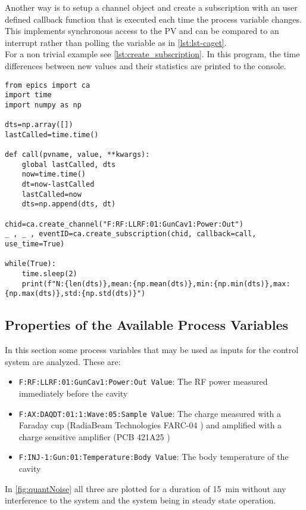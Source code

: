 Another way is to setup a channel object and create a subscription with an user defined callback function that is executed each time the process variable changes. This implements synchronous access to the PV and can be compared to an interrupt rather than polling the variable as in \autoref{lst:lst-caget}.\\
For a non trivial example see \autoref{lst:create_subscription}. In this program, the time differences between new values and their statistics are printed to the console.

\begin{lstlisting}[style=python,caption = Using a user defined callback function to access an EPICS process value, label = lst:create_subscription]
from epics import ca
import time
import numpy as np

dts=np.array([])
lastCalled=time.time()

def call(pvname, value, **kwargs):
	global lastCalled, dts
	now=time.time()
	dt=now-lastCalled
	lastCalled=now
	dts=np.append(dts, dt)

chid=ca.create_channel("F:RF:LLRF:01:GunCav1:Power:Out")
_ , _ , eventID=ca.create_subscription(chid, callback=call, use_time=True)

while(True):
	time.sleep(2)
	print(f"N:{len(dts)},mean:{np.mean(dts)},min:{np.min(dts)},max:{np.max(dts)},std:{np.std(dts)}")
\end{lstlisting}




\subsection{Properties of the Available Process Variables}
In this section some process variables that may be used as inputs for the control system are analyzed. These are:
\begin{itemize}
\item \texttt{F:RF:LLRF:01:GunCav1:Power:Out Value}: The RF power measured immediately before the cavity
\item \texttt{F:AX:DAQDT:01:1:Wave:05:Sample Value}: The charge measured with a Faraday cup (RadiaBeam Technologies FARC-04 \cite{radiabeamFaradayCups}) and amplified with a charge sensitive amplifier (PCB 421A25 \cite{pcbsynotechPCB421A25Charge})
\item \texttt{F:INJ-1:Gun:01:Temperature:Body Value}: The body temperature of the cavity
\end{itemize}

In \autoref{fig:quantNoise} all three are plotted for a duration of \SI{15}{\minute} without any interference to the system and the system being in steady state operation.

